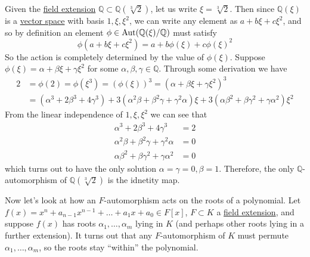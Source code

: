   \begin{example}
    \label{ex:computing-autq213q}
    Given the \hyperref[def:field-extension]{field extension} $\mathbb{Q} \subset \mathbb{Q}(\sqrt[3]{2})$, let us write $\xi = \sqrt[3]{2}$. Then since $\mathbb{Q}(\xi)$ is a \hyperref[def:vector-space]{vector space} with basis $1, \xi, \xi^2$, we can write any element as $a + b \xi + c \xi^2$, and so by definition an element $\phi \in \operatorname{Aut}(\mathbb{Q}(\xi)/\mathbb{Q})$ must satisfy 
    \begin{equation}
      \phi(a + b \xi + c \xi^2) = a + b \phi(\xi) + c \phi(\xi)^2
    \end{equation}
    So the action is completely determined by the value of $\phi(\xi)$. Suppose $\phi(\xi) = \alpha + \beta \xi + \gamma \xi^2$ for some $\alpha, \beta, \gamma \in \mathbb{Q}$. Through some derivation we have 
    \begin{align}
      2 & = \phi(2) = \phi(\xi^3) = (\phi(\xi))^3 = (\alpha + \beta \xi + \gamma \xi^2)^3 \\ 
        & = (\alpha^3 + 2\beta^3 + 4\gamma^3) + 3(\alpha^2\beta + \beta^2\gamma + \gamma^2\alpha)\xi + 3(\alpha\beta^2 + \beta\gamma^2 + \gamma\alpha^2)\xi^2
    \end{align} 
    From the linear independence of $1, \xi, \xi^2$ we can see that 
    \begin{align}
      \alpha^3 + 2\beta^3 + 4\gamma^3 &= 2 \\
      \alpha^2\beta + \beta^2\gamma + \gamma^2\alpha &= 0 \\
      \alpha\beta^2 + \beta\gamma^2 + \gamma\alpha^2 &= 0
    \end{align}
    which turns out to have the only solution $\alpha = \gamma = 0, \beta = 1$. Therefore, the only $\mathbb{Q}$-automorphism of $\mathbb{Q}(\sqrt[3]{2})$ is the idnetity map. 
  \end{example} 

  Now let's look at how an $F$-automorphism acts on the roots of a polynomial. Let $f(x) = x^n + a_{n-1} x^{n-1} + \ldots + a_1 x + a_0 \in F[x]$, $F \subset K$ a \hyperref[def:field-extension]{field extension}, and suppose $f(x)$ has roots $\alpha_1, \ldots, \alpha_m$ lying in $K$ (and perhaps other roots lying in a further extension). It turns out that any $F$-automorphism of $K$ must permute $\alpha_1, \ldots, \alpha_m$, so the roots stay ``within'' the polynomial. 

